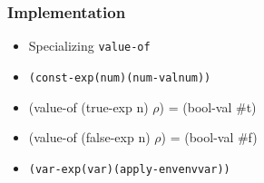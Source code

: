 \documentclass{beamer}
\begin{document}
\begin{frame}[fragile]
\frametitle{Implementation}
\begin{scriptsize}
\begin{itemize}
\item<1-> Specializing \texttt{value-of}

\item<2->
\begin{alltt}
(const-exp (num) (num-val num))
\end{alltt}

\item<3-> (value-of (true-exp n) $\rho$) = (bool-val \#t)

\item<3-> (value-of (false-exp n) $\rho$) = (bool-val \#f)

\item<4->
\begin{alltt}
(var-exp (var) (apply-env env var))
\end{alltt}

\end{itemize}
\end{scriptsize}
\end{frame}
\end{document}

